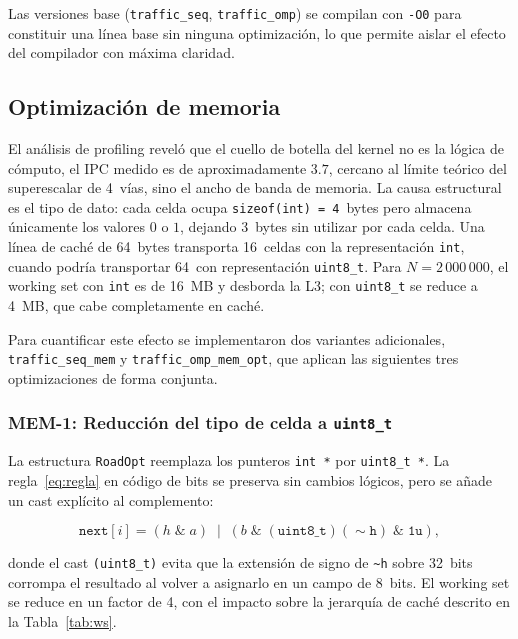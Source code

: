Las versiones base (\texttt{traffic\_seq}, \texttt{traffic\_omp}) se
compilan con \texttt{-O0} para constituir una línea base sin ninguna
optimización, lo que permite aislar el efecto del compilador con máxima
claridad.

\subsection{Optimización de memoria}

El análisis de profiling reveló que el cuello de botella del kernel no es
la lógica de cómputo, el IPC medido es de aproximadamente $3.7$, cercano
al límite teórico del superescalar de 4~vías, sino el ancho de banda de
memoria. La causa estructural es el tipo de dato: cada celda ocupa
\texttt{sizeof(int) = 4}~bytes pero almacena únicamente los valores $0$ o
$1$, dejando 3~bytes sin utilizar por cada celda. Una línea de caché de
64~bytes transporta 16~celdas con la representación \texttt{int}, cuando
podría transportar 64~con representación \texttt{uint8\_t}. Para
$N = 2\,000\,000$, el working set con \texttt{int} es de 16~MB y
desborda la L3; con \texttt{uint8\_t} se reduce a 4~MB, que cabe
completamente en caché.

Para cuantificar este efecto se implementaron dos variantes adicionales,
\texttt{traffic\_seq\_mem} y \texttt{traffic\_omp\_mem\_opt}, que
aplican las siguientes tres optimizaciones de forma conjunta.

\subsubsection{MEM-1: Reducción del tipo de celda a \texttt{uint8\_t}}

La estructura \texttt{RoadOpt} reemplaza los punteros \texttt{int~*} por
\texttt{uint8\_t~*}. La regla~\eqref{eq:regla} en código de bits se
preserva sin cambios lógicos, pero se añade un cast explícito al
complemento:

\begin{equation}
    \texttt{next}[i] =
    (h \;\&\; a) \;\mid\;
    (b \;\&\; \mathtt{(uint8\_t)(\sim h)} \;\&\; \mathtt{1u}),
\end{equation}

donde el cast \texttt{(uint8\_t)} evita que la extensión de signo de
\texttt{\textasciitilde h} sobre 32~bits corrompa el resultado al volver a
asignarlo en un campo de 8~bits. El working set se reduce en un factor de
4, con el impacto sobre la jerarquía de caché descrito en la
Tabla~\ref{tab:ws}.

